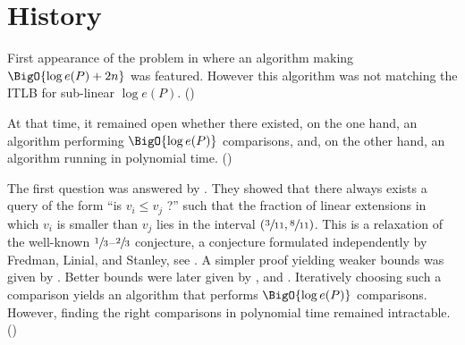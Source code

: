

\section{History}

First appearance of the problem in \cite{fredman1976good} where an algorithm making $\BigO{\log e(P) + 2n}$ was featured. However this algorithm was not matching the ITLB for sub-linear $\log e(P)$. (\cite{cardinal2013sorting})

At that time, it remained open whether there existed, on the one hand, an algorithm performing $\BigO{\log e(P)}$ comparisons, and, on the other hand, an algorithm running in polynomial time. (\cite{cardinal2013sorting})

The first question was answered by \cite{kahn1984balancing}. They showed that there always exists a query of the form ``is $v_i \leq v_j$ ?'' such that the fraction of linear extensions in which $v_i$ is smaller than $v_j$ lies in the interval $(\sfrac{3}{11}, \sfrac{8}{11})$. This is a relaxation of the well-known $\sfrac{1}{3}$--$\sfrac{2}{3}$ conjecture, a conjecture formulated independently by Fredman, Linial, and Stanley, see \cite{linial1984information}. A simpler proof yielding weaker bounds was given by \cite{kahn1991balancing}. Better bounds were later given by \cite{brightwell1995balancing}, and \cite{brightwell1999balanced}. Iteratively choosing such a comparison yields an algorithm that performs $\BigO{\log e(P)}$ comparisons. However, finding the right comparisons in polynomial time remained intractable. (\cite{cardinal2013sorting})

